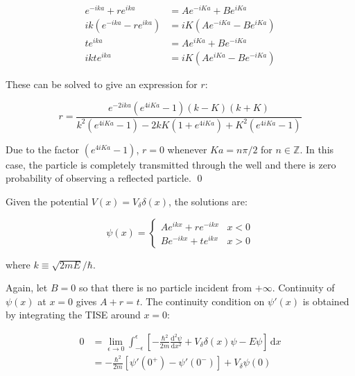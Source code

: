 \documentclass[12pt]{article}
\begin{document}
\begin{equation}
\begin{split}
    e^{-ika} + re^{ika} &= Ae^{-iKa} + Be^{iKa} \\
    ik(e^{-ika} - re^{ika}) &= iK(Ae^{-iKa} - Be^{iKa}) \\
    te^{ika} &= Ae^{iKa} + Be^{-iKa} \\
    ikte^{ika} &= iK(Ae^{iKa} - Be^{-iKa})
\end{split}
\end{equation}

These can be solved to give an expression for $r$:

\begin{equation}
    r = \frac{e^{-2ika} \left( e^{4iKa} - 1 \right) (k - K) (k + K)}{k^{2} \left( e^{4iKa} - 1 \right) - 2kK \left( 1 + e^{4iKa} \right) + K^{2} \left( e^{4iKa} - 1 \right)}
\end{equation}

Due to the factor $(e^{4iKa} - 1)$, $r = 0$ whenever $Ka = n\pi/2$ for $n \in \mathbb{Z}$. In this case, the particle is completely transmitted through the well and there is zero probability of observing a reflected particle.
\qed


Given the potential $V(x) = V_{\delta} \delta(x)$, the solutions are:

\begin{equation}
    \psi(x) =
    \begin{cases}
        Ae^{ikx} + re^{-ikx} & x < 0 \\
        Be^{-ikx} + te^{ikx} & x > 0
    \end{cases}
\end{equation}

where $k \equiv \sqrt{2mE}/\hbar$.

Again, let $B = 0$ so that there is no particle incident from $+\infty$. Continuity of $\psi(x)$ at $x = 0$ gives $A + r = t$. The continuity condition on $\psi'(x)$ is obtained by integrating the TISE around $x = 0$:

\begin{equation}
\begin{split}
    0 &= \lim_{\epsilon \to 0} \int_{-\epsilon}^{\epsilon} \left[ -\frac{\hbar^{2}}{2m} \frac{\mathrm{d}^{2} \psi}{\mathrm{d}x^{2}} + V_{\delta} \delta(x) \psi - E \psi \right] \, \mathrm{d}x \\
    &= -\frac{\hbar^{2}}{2m} \left[ \psi'(0^{+}) - \psi'(0^{-}) \right] + V_{\delta} \psi(0)
\end{split}
\end{equation}
\end{document}
